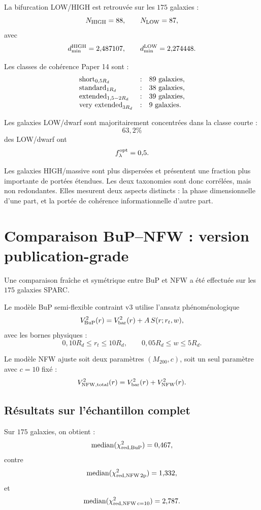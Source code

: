 \documentclass[11pt,a4paper]{article}
\begin{document}
La bifurcation LOW/HIGH est retrouvée sur les \(175\) galaxies :
\[
N_{\rm HIGH}=88,
\qquad
N_{\rm LOW}=87,
\]
avec
\[
d_{\min}^{\rm HIGH}=2{,}487107,
\qquad
d_{\min}^{\rm LOW}=2{,}274448.
\]

Les classes de cohérence Paper 14 sont :
\[
\begin{array}{lcl}
{\rm short}_{0{,}5R_d} &:& 89 \ {\rm galaxies},\\
{\rm standard}_{1R_d} &:& 38 \ {\rm galaxies},\\
{\rm extended}_{1{,}5-2R_d} &:& 39 \ {\rm galaxies},\\
{\rm very\ extended}_{3R_d} &:& 9 \ {\rm galaxies}.
\end{array}
\]

Les galaxies LOW/dwarf sont majoritairement concentrées dans la classe courte :
\[
63{,}2\%
\]
des LOW/dwarf ont
\[
f_\lambda^{\rm opt}=0{,}5.
\]

Les galaxies HIGH/massive sont plus dispersées et présentent une fraction plus
importante de portées étendues. Les deux taxonomies sont donc corrélées, mais
non redondantes. Elles mesurent deux aspects distincts : la phase
dimensionnelle d'une part, et la portée de cohérence informationnelle d'autre
part.

\section{Comparaison BuP--NFW : version publication-grade}

Une comparaison fraîche et symétrique entre BuP et NFW a été effectuée sur
les \(175\) galaxies SPARC.

Le modèle BuP semi-flexible contraint v3 utilise l'ansatz phénoménologique
\[
V_{\rm BuP}^2(r)
=
V_{\rm bar}^2(r)
+
A\,S(r;r_t,w),
\]
avec les bornes physiques :
\[
0{,}10R_d \le r_t \le 10R_d,
\qquad
0{,}05R_d \le w \le 5R_d.
\]

Le modèle NFW ajuste soit deux paramètres \((M_{200},c)\), soit un seul
paramètre avec \(c=10\) fixé :
\[
V_{\rm NFW,total}^2(r)
=
V_{\rm bar}^2(r)
+
V_{\rm NFW}^2(r).
\]

\subsection{Résultats sur l'échantillon complet}

Sur \(175\) galaxies, on obtient :
\[
{\rm median}(\chi^2_{\rm red,BuP})=0{,}467,
\]
contre
\[
{\rm median}(\chi^2_{\rm red,NFW\,2p})=1{,}332,
\]
et
\[
{\rm median}(\chi^2_{\rm red,NFW\,c=10})=2{,}787.
\]
\end{document}
